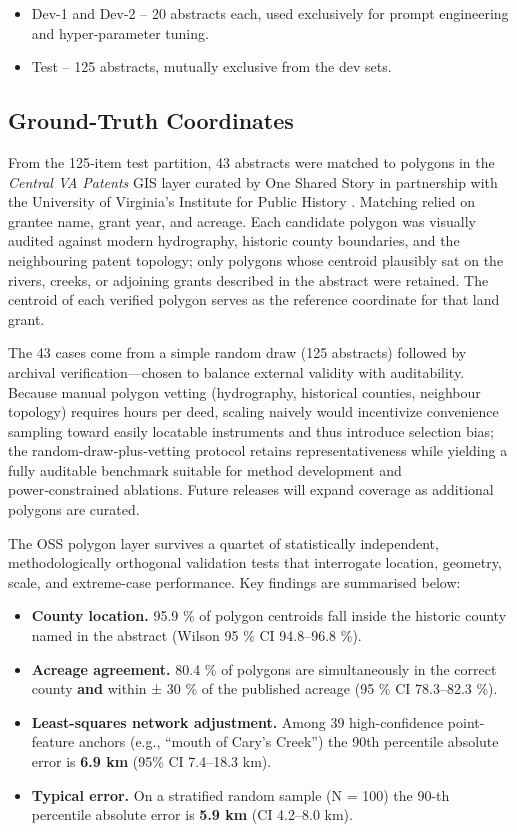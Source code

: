 \begin{itemize}
\tightlist
\item
  Dev-1 and Dev-2 -- 20 abstracts each, used exclusively for prompt
  engineering and hyper-parameter tuning.
\item
  Test -- 125 abstracts, mutually exclusive from the dev sets.
\end{itemize}

\subsection{Ground-Truth
Coordinates}\label{ground-truth-coordinates}

From the 125‑item test partition, 43 abstracts were matched to polygons
in the \emph{Central VA Patents} GIS layer curated by One Shared Story
in partnership with the University of Virginia's Institute for Public
History \citep{central_va_patents_gis}. Matching relied on grantee name,
grant year, and acreage. Each candidate polygon was visually audited
against modern hydrography, historic county boundaries, and the
neighbouring patent topology; only polygons whose centroid plausibly sat
on the rivers, creeks, or adjoining grants described in the abstract
were retained. The centroid of each verified polygon serves as the
reference coordinate for that land grant.

The 43 cases come from a simple random draw (125 abstracts) followed by
archival verification---chosen to balance external validity with
auditability. Because manual polygon vetting (hydrography, historical
counties, neighbour topology) requires hours per deed, scaling naively
would incentivize convenience sampling toward easily locatable
instruments and thus introduce selection bias; the
random‑draw‑plus‑vetting protocol retains representativeness while
yielding a fully auditable benchmark suitable for method development and
power‑constrained ablations. Future releases will expand coverage as
additional polygons are curated.

The OSS polygon layer survives a quartet of statistically independent,
methodologically orthogonal validation tests that interrogate location,
geometry, scale, and extreme-case performance. Key findings are
summarised below:

\begin{itemize}
\tightlist
\item
  \textbf{County location.} 95.9 \% of polygon centroids fall inside the
  historic county named in the abstract (Wilson 95 \% CI 94.8--96.8 \%).
\item
  \textbf{Acreage agreement.} 80.4 \% of polygons are simultaneously in
  the correct county \textbf{and} within ± 30 \% of the published
  acreage (95 \% CI 78.3--82.3 \%).
\item
  \textbf{Least-squares network adjustment.} Among 39 high-confidence
  point-feature anchors (e.g., ``mouth of Cary's Creek'') the 90th
  percentile absolute error is \textbf{6.9 km} (95\% CI 7.4--18.3 km).
\item
  \textbf{Typical error.} On a stratified random sample (N = 100) the
  90-th percentile absolute error is \textbf{5.9 km} (CI 4.2--8.0 km).
\end{itemize}

